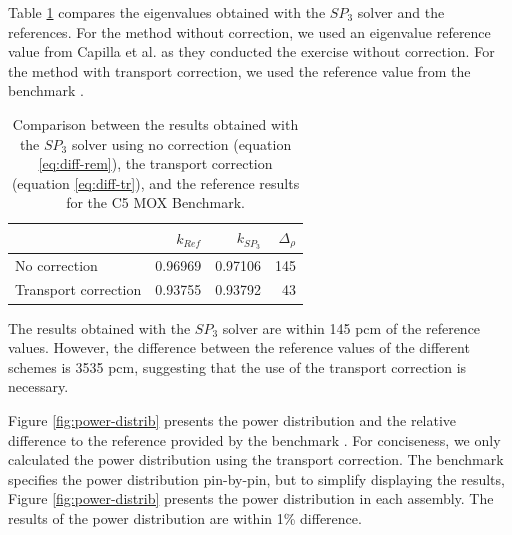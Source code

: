 \documentclass{anstrans}
\begin{document}
Table \ref{tab:keff-2nd} compares the eigenvalues obtained with the $SP_3$ solver and the references.
For the method without correction, we used an eigenvalue reference value from Capilla et al. \cite{capilla_applications_2009} as they conducted the exercise without correction.
For the method with transport correction, we used the reference value from the benchmark \cite{cavarec_benchmark_1994}.
\begin{table}[htbp!]
	\centering
	\caption{Comparison between the results obtained with the $SP_3$ solver using no correction (equation \ref{eq:diff-rem}), the transport correction (equation \ref{eq:diff-tr}), and the reference results for the C5 MOX Benchmark.}
	\label{tab:keff-2nd}
	\begin{tabular}{lrrr}
	\toprule
							& $k_{Ref}$ & $k_{SP_3}$	& $\Delta_{\rho}$	\\
	\midrule
	No correction			& 0.96969	& 0.97106		& 145				\\
	Transport correction	& 0.93755	& 0.93792		& 43				\\
	\bottomrule
	\end{tabular}
\end{table}

The results obtained with the $SP_3$ solver are within 145 pcm of the reference values.
However, the difference between the reference values of the different schemes is 3535 pcm, suggesting that the use of the transport correction is necessary.

Figure \ref{fig:power-distrib} presents the power distribution and the relative difference to the reference provided by the benchmark \cite{cavarec_benchmark_1994}.
For conciseness, we only calculated the power distribution using the transport correction.
The benchmark specifies the power distribution pin-by-pin, but to simplify displaying the results, Figure \ref{fig:power-distrib} presents the power distribution in each assembly.
The results of the power distribution are within 1\% difference.
\end{document}
